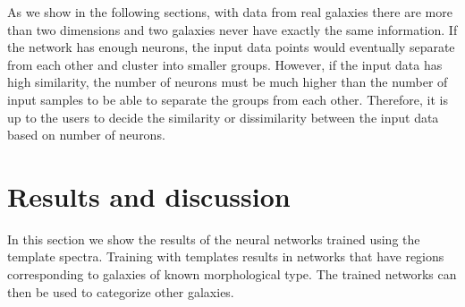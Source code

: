 As we show in the following sections, with data from real galaxies there are more than two dimensions and two galaxies never have exactly the same information. 
If the network has enough neurons, the input data points would eventually separate from each other and cluster into smaller groups. 
However, if the input data has high similarity, the number of neurons must be much higher than the number of input samples to be able to separate the groups from each other. 
Therefore, it is up to the users to decide the similarity or dissimilarity between the input data based on number of neurons. 

\section{Results and discussion}
\label{sec: result}

    In this section we show the results of the neural networks trained using the  template spectra.
    Training with  templates results in networks that have regions corresponding to galaxies of known morphological type. 
    The trained networks can then be used to categorize other galaxies.
    
